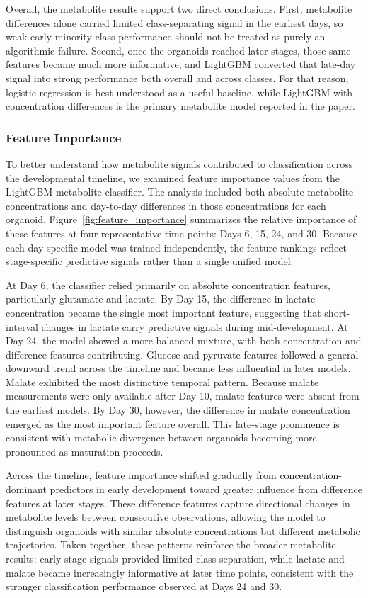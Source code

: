 \documentclass{article}
\begin{document}
Overall, the metabolite results support two direct conclusions. First, metabolite differences alone carried limited class-separating signal in the earliest days, so weak early minority-class performance should not be treated as purely an algorithmic failure. Second, once the organoids reached later stages, those same features became much more informative, and LightGBM converted that late-day signal into strong performance both overall and across classes. For that reason, logistic regression is best understood as a useful baseline, while LightGBM with concentration differences is the primary metabolite model reported in the paper.

\subsubsection{Feature Importance}

To better understand how metabolite signals contributed to classification across the developmental timeline, we examined feature importance values from the LightGBM metabolite classifier. The analysis included both absolute metabolite concentrations and day-to-day differences in those concentrations for each organoid. Figure~\ref{fig:feature_importance} summarizes the relative importance of these features at four representative time points: Days 6, 15, 24, and 30. Because each day-specific model was trained independently, the feature rankings reflect stage-specific predictive signals rather than a single unified model.

At Day 6, the classifier relied primarily on absolute concentration features, particularly glutamate and lactate. By Day 15, the difference in lactate concentration became the single most important feature, suggesting that short-interval changes in lactate carry predictive signals during mid-development. At Day 24, the model showed a more balanced mixture, with both concentration and difference features contributing. Glucose and pyruvate features followed a general downward trend across the timeline and became less influential in later models.
Malate exhibited the most distinctive temporal pattern. Because malate measurements were only available after Day 10, malate features were absent from the earliest models. By Day 30, however, the difference in malate concentration emerged as the most important feature overall. This late-stage prominence is consistent with metabolic divergence between organoids becoming more pronounced as maturation proceeds.

Across the timeline, feature importance shifted gradually from concentration-dominant predictors in early development toward greater influence from difference features at later stages. These difference features capture directional changes in metabolite levels between consecutive observations, allowing the model to distinguish organoids with similar absolute concentrations but different metabolic trajectories. Taken together, these patterns reinforce the broader metabolite results: early-stage signals provided limited class separation, while lactate and malate became increasingly informative at later time points, consistent with the stronger classification performance observed at Days 24 and 30.
\end{document}
